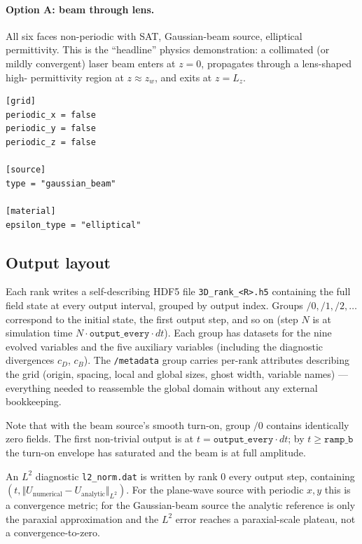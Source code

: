 \documentclass[11pt]{article}
\begin{document}
\paragraph{Option A: beam through lens.}
All six faces non-periodic with SAT, Gaussian-beam source,
elliptical permittivity. This is the ``headline'' physics
demonstration: a collimated (or mildly convergent) laser beam
enters at $z = 0$, propagates through a lens-shaped high-
permittivity region at $z \approx z_w$, and exits at $z = L_z$.
\begin{lstlisting}[language={}]
[grid]
periodic_x = false
periodic_y = false
periodic_z = false

[source]
type = "gaussian_beam"

[material]
epsilon_type = "elliptical"
\end{lstlisting}

\subsection{Output layout}

Each rank writes a self-describing HDF5 file
\texttt{3D\_rank\_<R>.h5} containing the full field state at every
output interval, grouped by output index. Groups $/0, /1, /2, \ldots$
correspond to the initial state, the first output step, and so on
(step $N$ is at simulation time
$N \cdot \mathtt{output\_every} \cdot dt$). Each group has datasets
for the nine evolved variables and the five auxiliary variables
(including the diagnostic divergences $c_D$, $c_B$). The \texttt{/metadata}
group carries per-rank attributes describing the grid (origin, spacing,
local and global sizes, ghost width, variable names) — everything
needed to reassemble the global domain without any external bookkeeping.

Note that with the beam source's smooth turn-on, group $/0$ contains
identically zero fields. The first non-trivial output is at
$t = \mathtt{output\_every} \cdot dt$; by $t \geq \mathtt{ramp\_b}$
the turn-on envelope has saturated and the beam is at full amplitude.

An $L^2$ diagnostic \texttt{l2\_norm.dat} is written by rank 0 every
output step, containing $(t, \Vert U_\text{numerical} - U_\text{analytic} \Vert_{L^2})$.
For the plane-wave source with periodic $x, y$ this is a convergence
metric; for the Gaussian-beam source the analytic reference is only the
paraxial approximation and the $L^2$ error reaches a paraxial-scale
plateau, not a convergence-to-zero.
\end{document}
